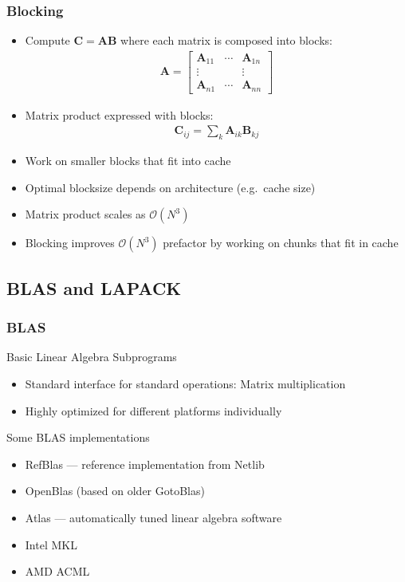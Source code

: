 \documentclass[usenames,dvipsnames,mathserif,compress]{beamer}
\begin{document}
\begin{frame}
  \frametitle{Blocking}
  \begin{itemize}
  \item
  Compute $\mathbf C = \mathbf A \mathbf B$ where each matrix is composed into
  blocks:
  \begin{align}
    \mathbf A = \left[
      \begin{matrix}
        \mathbf A_{11} &\cdots& \mathbf A_{1n}\\
        \vdots & & \vdots \\
        \mathbf A_{n1} & \cdots & \mathbf A_{nn}
      \end{matrix}\right]
  \end{align}

\item Matrix product expressed with blocks:
  \begin{align}
    \mathbf C_{ij} = \sum_{k} \mathbf A_{ik} \mathbf B_{kj}
  \end{align}
  \item Work on smaller blocks that fit into cache
  \item Optimal blocksize depends on architecture (e.g.\ cache size)
  \item Matrix product scales as $\mathcal O(N^3)$
  \item Blocking improves $\mathcal O(N^3)$ prefactor by working on
    chunks that fit in cache
  \end{itemize}
\end{frame}

\subsection*{BLAS and LAPACK}

\begin{frame}
  \frametitle{BLAS}
  \begin{block}{Basic Linear Algebra Subprograms}
  \end{block}
  \begin{itemize}
  \item Standard interface for standard operations:
    Matrix multiplication
  \item Highly optimized for different platforms individually
  \end{itemize}
  \begin{block}{Some BLAS implementations}
    \begin{itemize}
    \item RefBlas --- reference implementation from Netlib
    \item OpenBlas (based on older GotoBlas)
    \item Atlas --- automatically tuned linear algebra software
    \item Intel MKL
    \item AMD ACML
    \end{itemize}
  \end{block}
\end{frame}
\end{document}
